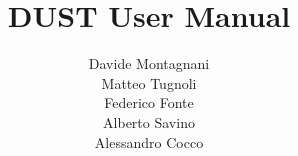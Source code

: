 
\def\Company{}
\def\Institute{}
\def\Department{}

\def\BoldTitle{DUST User Manual}

\def\Subtitle{}
\def\Authors{ Davide Montagnani \\ Matteo Tugnoli \\ Federico Fonte \\ Alberto Savino \\ Alessandro Cocco} 


\title{\textbf{\BoldTitle}\\\Subtitle}
\author{\Authors \\ \\ \\ \Institute\\ \Department\\}

